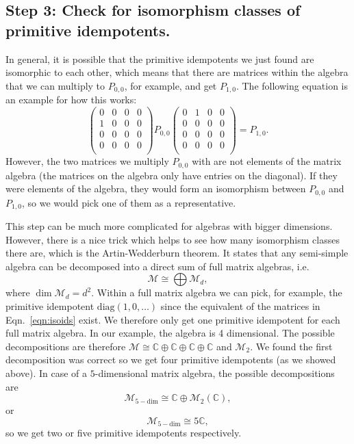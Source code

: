 \subsection*{Step 3: Check for isomorphism classes of primitive idempotents.} In general, it is possible that the primitive idempotents we just found are isomorphic to each other, which means that there are matrices within the algebra that we can multiply to $P_{0,0}$, for example, and get $P_{1,0}$. The following equation is an example for how this works:
	\begin{equation}
		\begin{pmatrix} 0 & 0 & 0 & 0\\ 1 & 0 & 0 & 0\\ 0 & 0 & 0 & 0\\ 0 & 0 & 0 & 0\\ \end{pmatrix}P_{0,0} \begin{pmatrix} 0 & 1 & 0 & 0\\ 0 & 0 & 0 & 0\\ 0 & 0 & 0 & 0\\ 0 & 0 & 0 & 0\\ \end{pmatrix}=P_{1,0}.\label{eqn:isoids}
	\end{equation}
However, the two matrices we multiply $P_{0,0}$ with are not elements of the matrix algebra (the matrices on the algebra only have entries on the diagonal). If they were elements of the algebra, they would form an isomorphism between $P_{0,0}$ and $P_{1,0}$, so we would pick one of them as a representative.

This step can be much more complicated for algebras with bigger dimensions. However, there is a nice trick which helps to see how many isomorphism classes there are, which is the Artin-Wedderburn theorem. It states that any semi-simple algebra can be decomposed into a direct sum of full matrix algebras, i.e.
	\begin{equation}
		\mathcal{M}\cong\bigoplus\mathcal{M}_d,
	\end{equation}
	where $\dim{\mathcal{M}_d}=d^2$. Within a full matrix algebra we can pick, for example, the primitive idempotent $\mathrm{diag}(1,0,\ldots)$ since the equivalent of the matrices in Eqn.~\ref{eqn:isoids} exist. We therefore only get one primitive idempotent for each full matrix algebra. In our example, the algebra is 4 dimensional. The possible decompositions are therefore 
	$\mathcal{M}\cong\mathbb{C}\oplus\mathbb{C}\oplus\mathbb{C}\oplus\mathbb{C}$ and $\mathcal{M}_2$. We found the first decomposition was correct so we get four primitive idempotents (as we showed above). 
	In case of a $5$-dimensional matrix algebra, the possible decompositions are
	\begin{equation}
		\mathcal{M}_{5-\mathrm{dim}}\cong\mathbb{C}\oplus\mathcal{M}_2(\mathbb{C}),
	\end{equation}
	or 
	\begin{equation}
		\mathcal{M}_{5-\mathrm{dim}}\cong5\mathbb{C},
	\end{equation}
so we get two or five primitive idempotents respectively.
	
